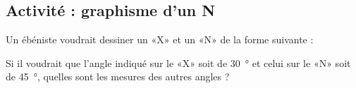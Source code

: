 
\subsection*{Activité : graphisme d'un N}

Un ébéniste voudrait dessiner un «X» et un «N» de la forme suivante :

\begin{center}
\quad
   
\end{center}

Si il voudrait que l'angle indiqué sur le «X»  soit de \SI{30}{\degree} et celui sur le «N»  soit de \SI{45}{\degree}, quelles sont les mesures des autres angles ?
